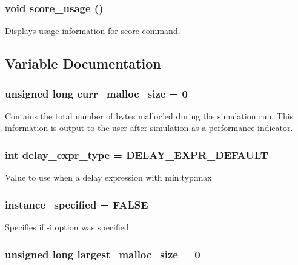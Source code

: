 \subsubsection{\setlength{\rightskip}{0pt plus 5cm}void score\_\-usage ()}\label{score_8c_a12}


Displays usage information for score command. 

\subsection{Variable Documentation}
\subsubsection{\setlength{\rightskip}{0pt plus 5cm}unsigned long curr\_\-malloc\_\-size = 0}\label{score_8c_a8}


Contains the total number of bytes malloc'ed during the simulation run. This information is output to the user after simulation as a performance indicator. 
\subsubsection{\setlength{\rightskip}{0pt plus 5cm}int delay\_\-expr\_\-type = DELAY\_\-EXPR\_\-DEFAULT}\label{score_8c_a4}


Value to use when a delay expression with min:typ:max 
\subsubsection{ instance\_\-specified = FALSE}\label{score_8c_a6}


Specifies if -i option was specified 
\subsubsection{\setlength{\rightskip}{0pt plus 5cm}unsigned long largest\_\-malloc\_\-size = 0}\label{score_8c_a7}


